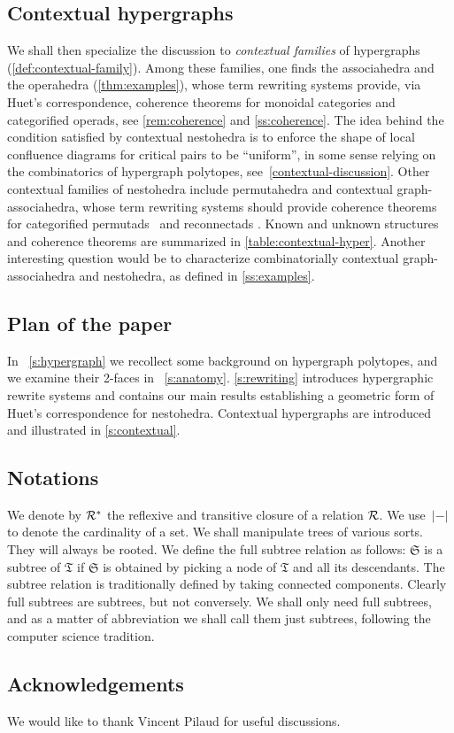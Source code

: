 \subsection*{Contextual hypergraphs}

We shall then specialize the discussion to \emph{contextual families} of hypergraphs (\cref{def:contextual-family}). 
Among these families, one finds the associahedra and the operahedra (\cref{thm:examples}), whose term rewriting systems provide, via Huet's correspondence, coherence theorems for monoidal categories and categorified operads, see \cref{rem:coherence} and \cref{ss:coherence}.  
The idea behind the condition satisfied by contextual nestohedra is to enforce the shape of local confluence diagrams for critical pairs to be ``uniform'', in some sense relying on the combinatorics of hypergraph polytopes, see~\cref{contextual-discussion}.
Other contextual families of nestohedra include permutahedra and contextual graph-associahedra, whose term rewriting systems should provide coherence theorems for categorified permutads~\cite{LodayRonco11,Markl19} and reconnectads \cite{DotsenkoKeilthyLyskov}.
Known and unknown structures and coherence theorems are summarized in \cref{table:contextual-hyper}.
Another interesting question would be to characterize combinatorially contextual graph-associahedra and nestohedra, as defined in \cref{ss:examples}. 

\subsection*{Plan of the paper}
In~ \cref{s:hypergraph} we recollect some background on hypergraph polytopes, and we examine their 2-faces in~ \cref{s:anatomy}.   \cref{s:rewriting} introduces hypergraphic rewrite systems and contains our main results establishing a geometric form of Huet's correspondence for nestohedra. 
Contextual hypergraphs are introduced and illustrated in  \cref{s:contextual}.

\subsection*{Notations}

We denote by ${\cal R}^*$ the reflexive and transitive closure of a relation ${\cal R}$. 
We use~$|-|$ to denote the cardinality of a set.
We shall manipulate trees of various sorts. They will always be rooted.  We define the  full subtree relation as follows: $\mathfrak{S}$
is a subtree of $\mathfrak{T}$ if $\mathfrak{S}$ is obtained by picking a node of $\mathfrak{T}$ and all its descendants. The subtree relation is traditionally defined by taking connected components. Clearly full subtrees are subtrees, but not conversely. We shall only need full subtrees, and as a matter of abbreviation we shall call them just subtrees, following the computer science tradition.

\subsection*{Acknowledgements}
We would like to thank Vincent Pilaud for useful discussions.


